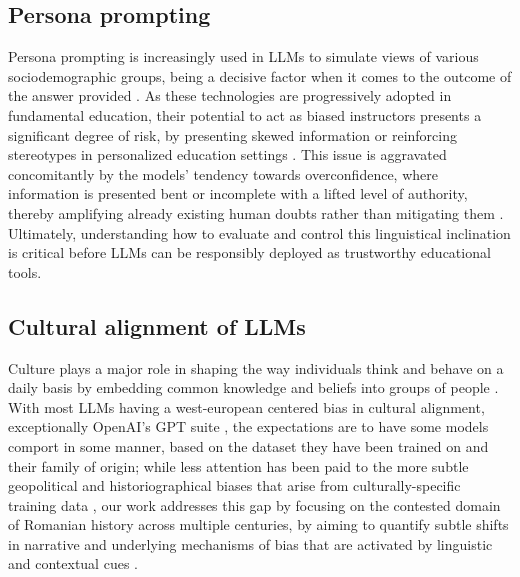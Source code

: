 \documentclass[11pt]{article}
\begin{document}
\subsection{Persona prompting}
Persona prompting is increasingly used in LLMs to simulate views of various sociodemographic groups, being a decisive factor when it comes to the outcome of the answer provided \cite{lutz2025}. As these technologies are progressively adopted in fundamental education, their potential to act as biased instructors presents a significant degree of risk, by presenting skewed information or reinforcing stereotypes in personalized education settings \cite{weissburg2025}. This issue is aggravated concomitantly by the models' tendency towards overconfidence, where information is presented bent or incomplete with a lifted level of authority, thereby amplifying already existing human doubts rather than mitigating them \cite{sun2025}. Ultimately, understanding how to evaluate and control this linguistical inclination is critical before LLMs can be responsibly deployed as trustworthy educational tools.

\subsection{Cultural alignment of LLMs}
Culture plays a major role in shaping the way individuals think and behave on a daily basis \cite{oyserman2008} by embedding common knowledge and beliefs into groups of people \cite{hofstede2001}. With most LLMs having a west-european centered bias in cultural alignment, exceptionally OpenAI's GPT suite \cite{tao2024}, the expectations are to have some models comport in some manner, based on the dataset they have been trained on and their family of origin; while less attention has been paid to the more subtle geopolitical and historiographical biases that arise from culturally-specific training data \cite{hauser2024}, our work addresses this gap by focusing on the contested domain of Romanian history across multiple centuries, by aiming to quantify subtle shifts in narrative and underlying mechanisms of bias that are activated by linguistic and contextual cues \cite{bhatia2024}.
\end{document}
